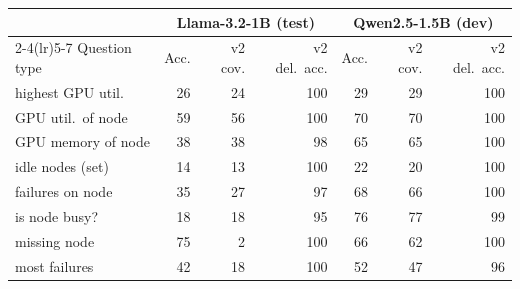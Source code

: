 \begin{tabular}{lrrrrrr}
\toprule
 & \multicolumn{3}{c}{Llama-3.2-1B (test)} & \multicolumn{3}{c}{Qwen2.5-1.5B (dev)} \\
\cmidrule(lr){2-4}\cmidrule(lr){5-7}
Question type & Acc. & v2 cov. & v2 del.\ acc. & Acc. & v2 cov. & v2 del.\ acc. \\
\midrule
highest GPU util. & 26 & 24 & 100 & 29 & 29 & 100 \\
GPU util.\ of node & 59 & 56 & 100 & 70 & 70 & 100 \\
GPU memory of node & 38 & 38 & 98 & 65 & 65 & 100 \\
idle nodes (set) & 14 & 13 & 100 & 22 & 20 & 100 \\
failures on node & 35 & 27 & 97 & 68 & 66 & 100 \\
is node busy? & 18 & 18 & 95 & 76 & 77 & 99 \\
missing node & 75 & 2 & 100 & 66 & 62 & 100 \\
most failures & 42 & 18 & 100 & 52 & 47 & 96 \\
\bottomrule
\end{tabular}